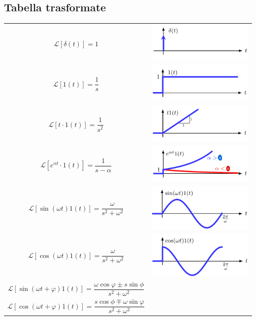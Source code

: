 \documentclass{article}
\numberwithin{equation}{subsection}
\let\oldsubsection\subsection%
\renewcommand{\subsection}{%
  \renewcommand{\theequation}{\thesubsection.\arabic{equation}}%
  \oldsubsection}%
\begin{document}
\subsection{Tabella trasformate}

\begin{center}
    \renewcommand{\arraystretch}{5}
    \begin{tabular}{c c}
        $\mathcal{L}[\delta(t)]=1$ & 
        \includegraphics[width=0.25\linewidth, valign=c]{Images/Delta.png}
        \\
        $\mathcal{L}[1(t)]=\dfrac{1}{s}$ & 
        \includegraphics[width=0.25\linewidth, valign=c]{Images/Scalino.png}
        \\
        $\mathcal{L}[t \cdot 1(t)]=\dfrac{1}{s^2}$ & 
        \includegraphics[width=0.25\linewidth, valign=c]{Images/Scalino_2.png}
        \\
        $\mathcal{L}[e^{\alpha t} \cdot 1(t)]=\dfrac{1}{s-\alpha}$ & 
        \includegraphics[width=0.25\linewidth, valign=c]{Images/Scalino_3.png}\\
        $\mathcal{L}[\sin(\omega t)1(t)]= \dfrac{\omega}{s^2+\omega^2}$ & \includegraphics[width=0.25\linewidth, valign=c]{Images/Trasformata_seno.png}\\
        $\mathcal{L}[\cos(\omega t)1(t)]= \dfrac{\omega}{s^2+\omega^2}$ & \includegraphics[width=0.25\linewidth, valign=c]{Images/Trasformata_coseno.png}\\
        $\mathcal{L}[\sin(\omega t + \varphi)1(t)]= \dfrac{\omega \cos\varphi \pm s \sin\phi}{s^2+\omega^2}$\\
        $\mathcal{L}[\cos(\omega t + \varphi)1(t)]= \dfrac{s \cos\phi \mp \omega \sin\varphi}{s^2+\omega^2}$
    \end{tabular}
\end{center}
\end{document}
